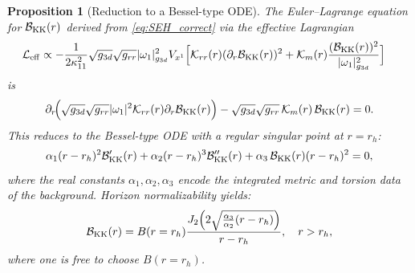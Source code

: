 \documentclass[a4paper,11pt,fleqn]{article}
\theoremstyle{plain}
\newtheorem{proposition}[theorem]{Proposition}
\theoremstyle{definition}
\newcommand{\Nf}{{\cal B}_{\rm KK}(r)}
\newcommand{\gthree}{g_{3d}}
\newcommand{\grr}{g_{rr}}
\newcommand{\kap}{\kappa_{11}}
\newcommand{\Leff}{\mathcal{L}_{\mathrm{eff}}}
\newcommand{\rh}{r_h}
\newcommand{\anu}{\alpha_1}
\newcommand{\ade}{\alpha_2}
\newcommand{\ath}{\alpha_3}
\begin{document}
\begin{proposition}[Reduction to a Bessel-type ODE]
\label{prop:ODE}
The Euler--Lagrange equation for $\mathcal{B}_{\rm KK}(r)$ derived from
\eqref{eq:SEH_correct} via the effective Lagrangian
\begin{align}
\Leff
&\propto -\frac{1}{2\kap^2}\sqrt{\gthree}\sqrt{\grr}|\omega_1|^2_{\gthree}V_{x^1}
\Bigl[\mathcal{K}_{rr}(r)(\partial_r\Nf)^2
+ \mathcal{K}_m(r)\frac{(\Nf)^2}{|\omega_1|^2_{\gthree}}\Bigr]
\label{eq:Leff}
\end{align}
is
\begin{equation}
\partial_r\!\Bigl(\sqrt{\gthree}\sqrt{\grr}|\omega_1|^2\mathcal{K}_{rr}(r)
\partial_r\Nf\Bigr)
- \sqrt{\gthree}\sqrt{\grr}\,\mathcal{K}_m(r)\,\Nf = 0.
\label{eq:EOM}
\end{equation}
This reduces to the Bessel-type ODE with a regular singular point at $r=\rh$:
\begin{equation}
\anu(r-\rh)^2\mathcal{B}_{\rm KK}'(r)
+ \ade(r-\rh)^3\mathcal{B}_{\rm KK}''(r)
+ \ath\,\mathcal{B}_{\rm KK}(r)(r-\rh)^2 = 0,
\label{eq:NeffEOM}
\end{equation}
where the real constants $\anu,\ade,\ath$ encode the integrated
metric and torsion data of the background. Horizon normalizability yields:
\begin{equation*}
{\cal B}_{\rm KK}(r) = B(r=r_h) \frac{J_2\!\left(2\sqrt{\frac{\ath}{\ade}(r-\rh)}\right)}{r - r_h},
\quad r > \rh,
\end{equation*}
where one is free to choose $B(r=r_h)$.
\end{proposition}
\end{document}
